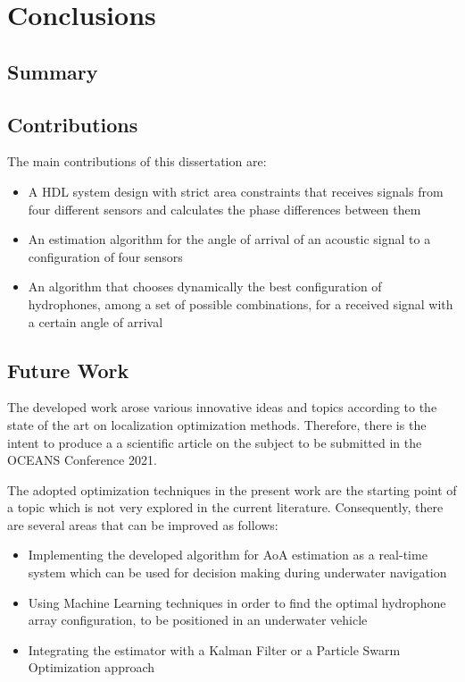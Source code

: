 \chapter{Conclusions}  \label{chap:conclusion}

\section{Summary}

\section{Contributions }

The main contributions of this dissertation are: 
\begin{itemize}
	\item A HDL system design with strict area constraints that receives signals from four different sensors and calculates the phase differences between them
	\item An estimation algorithm for the angle of arrival of an acoustic signal to a configuration of four sensors
	\item An algorithm that chooses dynamically the best configuration of hydrophones, among a set of possible combinations, for a received signal with a certain angle of arrival
\end{itemize}


\section{Future Work}

The developed work arose various innovative ideas and topics according to the state of the art on localization optimization methods. Therefore, there is the intent to produce a a scientific article on the subject to be submitted in the OCEANS Conference 2021.

The adopted optimization techniques in the present work are the starting point of a topic which is not very explored in the current literature. Consequently, there are several areas that can be improved as follows:

\begin{itemize}
	\item Implementing the developed algorithm for AoA estimation as a real-time system which can be used for decision making during underwater navigation
	\item Using Machine Learning techniques in order to find the optimal hydrophone array configuration, to be positioned in an underwater vehicle
	\item Integrating the estimator with a Kalman Filter or a Particle Swarm Optimization approach
\end{itemize}